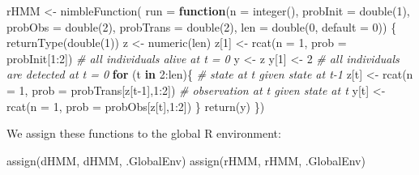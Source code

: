 \documentclass[
  12pt,
]{krantz}
\newenvironment{Shaded}{\begin{snugshade}}{\end{snugshade}}
\newcommand{\AttributeTok}[1]{\textcolor[rgb]{0.77,0.63,0.00}{#1}}
\newcommand{\CommentTok}[1]{\textcolor[rgb]{0.56,0.35,0.01}{\textit{#1}}}
\newcommand{\ControlFlowTok}[1]{\textcolor[rgb]{0.13,0.29,0.53}{\textbf{#1}}}
\newcommand{\DecValTok}[1]{\textcolor[rgb]{0.00,0.00,0.81}{#1}}
\newcommand{\FunctionTok}[1]{\textcolor[rgb]{0.00,0.00,0.00}{#1}}
\newcommand{\NormalTok}[1]{#1}
\newcommand{\OtherTok}[1]{\textcolor[rgb]{0.56,0.35,0.01}{#1}}
\newcommand{\SpecialCharTok}[1]{\textcolor[rgb]{0.00,0.00,0.00}{#1}}
\newcommand{\StringTok}[1]{\textcolor[rgb]{0.31,0.60,0.02}{#1}}
\begin{document}
\begin{Shaded}
\begin{Highlighting}[]
\NormalTok{rHMM }\OtherTok{\textless{}{-}} \FunctionTok{nimbleFunction}\NormalTok{(}
  \AttributeTok{run =} \ControlFlowTok{function}\NormalTok{(}\AttributeTok{n =} \FunctionTok{integer}\NormalTok{(),}
                 \AttributeTok{probInit =} \FunctionTok{double}\NormalTok{(}\DecValTok{1}\NormalTok{),}
                 \AttributeTok{probObs =} \FunctionTok{double}\NormalTok{(}\DecValTok{2}\NormalTok{),}
                 \AttributeTok{probTrans =} \FunctionTok{double}\NormalTok{(}\DecValTok{2}\NormalTok{),}
                 \AttributeTok{len =} \FunctionTok{double}\NormalTok{(}\DecValTok{0}\NormalTok{, }\AttributeTok{default =} \DecValTok{0}\NormalTok{)) \{}
    \FunctionTok{returnType}\NormalTok{(}\FunctionTok{double}\NormalTok{(}\DecValTok{1}\NormalTok{))}
\NormalTok{    z }\OtherTok{\textless{}{-}} \FunctionTok{numeric}\NormalTok{(len)}
\NormalTok{    z[}\DecValTok{1}\NormalTok{] }\OtherTok{\textless{}{-}} \FunctionTok{rcat}\NormalTok{(}\AttributeTok{n =} \DecValTok{1}\NormalTok{, }\AttributeTok{prob =}\NormalTok{ probInit[}\DecValTok{1}\SpecialCharTok{:}\DecValTok{2}\NormalTok{]) }\CommentTok{\# all individuals alive at t = 0}
\NormalTok{    y }\OtherTok{\textless{}{-}}\NormalTok{ z}
\NormalTok{    y[}\DecValTok{1}\NormalTok{] }\OtherTok{\textless{}{-}} \DecValTok{2} \CommentTok{\# all individuals are detected at t = 0}
    \ControlFlowTok{for}\NormalTok{ (t }\ControlFlowTok{in} \DecValTok{2}\SpecialCharTok{:}\NormalTok{len)\{}
      \CommentTok{\# state at t given state at t{-}1}
\NormalTok{      z[t] }\OtherTok{\textless{}{-}} \FunctionTok{rcat}\NormalTok{(}\AttributeTok{n =} \DecValTok{1}\NormalTok{, }\AttributeTok{prob =}\NormalTok{ probTrans[z[t}\DecValTok{{-}1}\NormalTok{],}\DecValTok{1}\SpecialCharTok{:}\DecValTok{2}\NormalTok{]) }
      \CommentTok{\# observation at t given state at t}
\NormalTok{      y[t] }\OtherTok{\textless{}{-}} \FunctionTok{rcat}\NormalTok{(}\AttributeTok{n =} \DecValTok{1}\NormalTok{, }\AttributeTok{prob =}\NormalTok{ probObs[z[t],}\DecValTok{1}\SpecialCharTok{:}\DecValTok{2}\NormalTok{]) }
\NormalTok{    \}}
    \FunctionTok{return}\NormalTok{(y)}
\NormalTok{  \})}
\end{Highlighting}
\end{Shaded}

We assign these functions to the global R environment:

\begin{Shaded}
\begin{Highlighting}[]
\FunctionTok{assign}\NormalTok{(}\StringTok{\textquotesingle{}dHMM\textquotesingle{}}\NormalTok{, dHMM, .GlobalEnv)}
\FunctionTok{assign}\NormalTok{(}\StringTok{\textquotesingle{}rHMM\textquotesingle{}}\NormalTok{, rHMM, .GlobalEnv)}
\end{Highlighting}
\end{Shaded}
\end{document}
